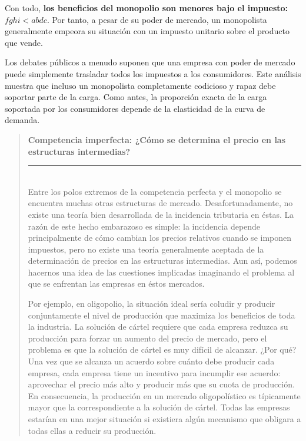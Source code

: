 \documentclass[10pt,a4paper]{article}
\newenvironment{specialblock}[1]{%
      \begin{quote} %
      \small %
      \noindent\textbf{#1}\\[-0.3em] %
      \rule{\linewidth}{0.4pt}\\[0.6em]}{
      \end{quote}}
\begin{document}
Con todo, \textbf{los beneficios del monopolio son menores bajo el impuesto: $fghi <abdc$}. Por tanto, a pesar de su poder de mercado, un monopolista generalmente empeora su situación con un impuesto unitario sobre el producto que vende. 

Los debates públicos a menudo suponen que una empresa con poder de mercado puede simplemente trasladar todos los impuestos a los consumidores. Este análisis muestra que incluso un monopolista completamente codicioso y rapaz debe soportar parte de la carga. Como antes, la proporción exacta de la carga soportada por los consumidores depende de la elasticidad de la curva de demanda.

\begin{specialblock}{Competencia imperfecta: ¿Cómo se determina el precio en las estructuras intermedias?}
    Entre los polos extremos de la competencia perfecta y el monopolio se encuentra muchas otras estructuras de mercado. Desafortunadamente, no existe una teoría bien desarrollada de la incidencia tributaria en éstas. La razón de este hecho embarazoso es simple: la incidencia depende principalmente de cómo cambian los precios relativos cuando se imponen impuestos, pero no existe una teoría generalmente aceptada de la determinación de precios en las estructuras intermedias. Aun así, podemos hacernos una idea de las cuestiones implicadas imaginando el problema al que se enfrentan las empresas en éstos mercados. 
    
    Por ejemplo, en oligopolio, la situación ideal sería coludir y producir conjuntamente el nivel de producción que maximiza los beneficios de toda la industria. La solución de cártel requiere que cada empresa reduzca su producción para forzar un aumento del precio de mercado, pero el problema es que la solución de cártel es muy difícil de alcanzar. ¿Por qué? Una vez que se alcanza un acuerdo sobre cuánto debe producir cada empresa, cada empresa tiene un incentivo para incumplir ese acuerdo: aprovechar el precio más alto y producir más que su cuota de producción. En consecuencia, la producción en un mercado oligopolístico es típicamente mayor que la correspondiente a la solución de cártel. Todas las empresas estarían en una mejor situación si existiera algún mecanismo que obligara a todas ellas a reducir su producción. 
    

\end{specialblock}
\end{document}
